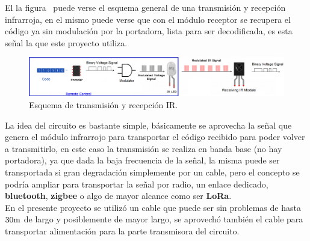 El la figura~ puede verse el esquema general de una transmisión y recepción infrarroja, en el mismo puede verse que con el módulo receptor se recupera el código ya sin modulación por la portadora, lista para ser decodificada, es esta señal la que este proyecto utiliza.


\clearpage


\begin{figure}[H]
	\centering
	\includegraphics[width=0.85\paperwidth, angle=90]{img/IR/IR-Remote-Receiver-Modulation.png}
	\caption{\footnotesize{Esquema de transmisión y recepción IR.}}
	\label{fig:IR_trans_rec}
\end{figure}


\clearpage


La idea del circuito es bastante simple, básicamente se aprovecha la señal que genera el módulo infrarrojo para transportar el código recibido para poder volver a transmitirlo, en este caso la transmisión se realiza en banda base (no hay portadora), ya que dada la baja frecuencia de la señal, la misma puede ser transportada si gran degradación simplemente  por un cable, pero el concepto se podría ampliar para transportar la señal por radio, un enlace dedicado, \textbf{bluetooth}, \textbf{zigbee} o algo de mayor alcance como ser \textbf{LoRa}. \\

En el presente proyecto se utilizó un cable que puede ser sin problemas de hasta $30 \si[per-mode=symbol]{\meter}$ de largo y posiblemente de mayor largo, se aprovechó también el cable para transportar alimentación para la parte transmisora del circuito.


